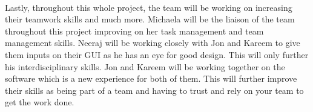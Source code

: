 \documentclass[12pt]{article}
\begin{document}
\newline
\\
\indent Lastly, throughout this whole project, the team will be working on increasing their teamwork skills and much more. Michaela will be the liaison of the team throughout this project improving on her task management and team management skills. 
Neeraj will be working closely with Jon and Kareem to give them inputs on their GUI as he has an eye for good design. This will only further his interdisciplinary skills. Jon and Kareem will be working together on the software which is a new experience for both of them.
This will further improve their skills as being part of a team and having to trust and rely on your team to get the work done.
\end{document}
